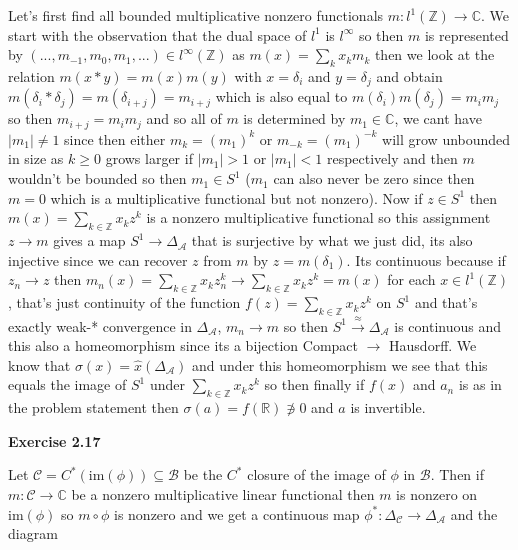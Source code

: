 \documentclass{article}
\begin{document}
Let's first find all bounded multiplicative nonzero functionals $m:l^1(\mathbb Z) \rightarrow \mathbb C$. We start with the observation that the dual space of $l^1$ is $l^\infty$ so then $m$ is represented by $(...,m_{-1}, m_0, m_1,...) \in l^\infty(\mathbb Z)$ as $m(x) = \sum\limits_k x_k m_k$ then we look at the relation $m(x*y) = m(x)m(y)$ with $x = \delta_i$ and $y = \delta_j$ and obtain $m(\delta_i * \delta_j) = m(\delta_{i+j}) = m_{i+j}$ which is also equal to $m(\delta_i)m(\delta_j) = m_im_j$ so then $m_{i+j} = m_i m_j$ and so all of $m$ is determined by $m_1 \in \mathbb C$, we cant have $|m_1| \neq 1$ since then either $m_k = (m_1)^k$ or $m_{-k} = (m_1)^{-k}$ will grow unbounded in size as $k \geq 0$ grows larger if $|m_1| > 1$ or $|m_1| < 1$ respectively and then $m$ wouldn't be bounded so then $m_1 \in S^1$ ($m_1$ can also never be zero since then $m = 0$ which is a multiplicative functional but not nonzero). Now if $z \in S^1$ then $m(x) = \sum\limits_{k \in \mathbb Z} x_k z^k$ is a nonzero multiplicative functional so this assignment $z \rightarrow m$ gives a map $S^1 \rightarrow \Delta_\mathcal A$ that is surjective by what we just did, its also injective since we can recover $z$ from $m$ by $z = m(\delta_1)$. Its continuous because if $z_n \rightarrow z$ then $m_n(x) =\sum\limits_{k \in \mathbb Z} x_k z_n^k \rightarrow \sum\limits_{k \in \mathbb Z} x_k z^k = m(x)$ for each $x \in l^1(\mathbb Z)$, that's just continuity of the function $f(z) = \sum\limits_{k \in \mathbb Z} x_k z^k$ on $S^1$ and that's exactly weak-* convergence in $\Delta_\mathcal A$, $m_n \rightarrow m$ so then $S^1 \xrightarrow \approx \Delta_\mathcal A$ is continuous and this also a homeomorphism since its a bijection Compact $\rightarrow$ Hausdorff. We know that $\sigma(x) = \hat x(\Delta_\mathcal A)$ and under this homeomorphism we see that this equals the image of $S^1$ under $\sum\limits_{k \in \mathbb Z} x_k z^k$ so then finally if $f(x)$ and $a_n$ is as in the problem statement then $\sigma(a) = f(\mathbb R) \not \ni 0$ and $a$ is invertible.

\vspace{0.5cm}

\textbf{Exercise 2.17}

\vspace{0.5cm}

Let $\mathcal C = C^*(\text{im}(\phi)) \subseteq \mathcal B$ be the $C^*$ closure of the image of $\phi$ in $\mathcal B$. Then if $m : \mathcal C \rightarrow \mathbb C$ be a nonzero multiplicative linear functional then $m$ is nonzero on $\text{im}(\phi)$ so $m \circ \phi$ is nonzero and we get a continuous map $\phi^* : \Delta_\mathcal C \rightarrow \Delta_\mathcal A$ and the diagram
\end{document}
